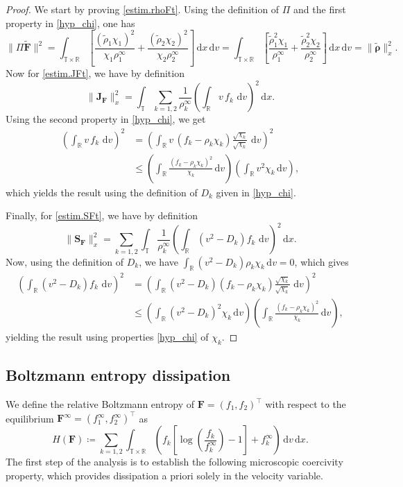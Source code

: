 \documentclass[reqno]{amsart}
\newcommand{\dd}{\,\mathrm{d}}
\newcommand{\R}{\mathbb{R}}
\newcommand{\T}{\mathbb{T}}
\newcommand{\Ft}{{\widetilde{F}}}
\newcommand{\rhot}{\widetilde{\rho}}
\newcommand{\Ftbf}{\mathbf{\Ft}}
\newcommand{\Fbf}{\mathbf{F}}
\newcommand{\Jbf}{\mathbf{J}}
\newcommand{\Sbf}{\mathbf{S}}
\newcommand{\rhotbf}{\boldsymbol{\rhot}}
\numberwithin{equation}{section}
\begin{document}
\begin{proof}
We start by proving \eqref{estim.rhoFt}. Using the definition of $\Pi$ and the first property in  \eqref{hyp_chi}, one has
\begin{equation*}
    \|\Pi \Ftbf\|^2= \int_{\T\times \R}\left[ \frac{(\rhot_1\chi_1)^2}{\chi_1\rho_1^\infty}+\frac{(\rhot_2\chi_2)^2}{\chi_2\rho_2^\infty} \right]\dd x \dd v=\int_{\T\times\R}\left[\frac{\rhot_1^2\chi_1}{\rho_1^\infty}+\frac{\rhot_2^2\chi_2}{\rho_2^\infty}\right]\dd x\dd v=\|\rhotbf\|^2_x.
\end{equation*}
Now for \eqref{estim.JFt}, we have by definition
\[\|\Jbf_\Fbf\|_x^2=\int_\T\sum_{k=1,2}\frac{1}{\rho_k^\infty}\left( \int_\R v\,f_k\,\dd v\right)^2\dd x.\]
Using the second property in \eqref{hyp_chi}, we get
\begin{align*}
    \left( \int_\R v\,f_k\,\dd v\right)^2&=\left( \int_\R v\,(f_k-\rho_k\chi_k)\frac{\sqrt{\chi_k}}{\sqrt{\chi_k}}\,\dd v\right)^2\\
    &\leq \left( \int_\R \frac{(f_k-\rho_k\chi_k)^2}{\chi_k}\dd v \right)\left(\int_\R v^2\chi_k\dd v \right),
\end{align*}
which yields the result using the definition of $D_k$ given in \eqref{hyp_chi}.

Finally, for \eqref{estim.SFt}, we have by definition
\[ \|\Sbf_\Fbf\|_x^2=\sum_{k=1,2}\int_\T\frac{1}{\rho_k^\infty}\left( \int_\R (v^2-D_k)f_k\,\dd v \right)^2\dd x.\]
Now, using the definition of $D_k$, we have $\int_\R (v^2-D_k)\rho_k\chi_k\dd v = 0$, which gives
\begin{align*}
    \left( \int_\R (v^2-D_k)f_k\,\dd v \right)^2&= \left( \int_\R (v^2-D_k)(f_k-\rho_k\chi_k)\frac{\sqrt{\chi_k}}{\sqrt{\chi_k}}\,\dd v \right)^2\\
    &\leq \left( \int_\R (v^2-D_k)^2\chi_k \dd v\right)\left(\int_\R \frac{(f_k-\rho_k\chi_k)^2}{\chi_k}\dd v \right),
\end{align*}
yielding the result using properties \eqref{hyp_chi} of $\chi_k$.
\end{proof}

\subsection{Boltzmann entropy dissipation}
We define the relative Boltzmann entropy of $\Fbf=(f_1,f_2)^\top$ with respect to the equilibrium $\Fbf^\infty=(f_1^\infty,f_2^\infty)^\top$ as
\begin{equation}\label{def.Boltzmann}
    H(\Fbf)\coloneq  \sum_{k=1,2}\int_{\T\times\R}\left( f_k\left[ \log\left( \frac{f_k}{f_k^\infty}\right)-1 \right] +f_k^\infty\right)\dd v\dd x.
\end{equation}
The first step of the analysis is to establish the following microscopic coercivity property, which provides dissipation a priori solely in the velocity variable.
\end{document}
